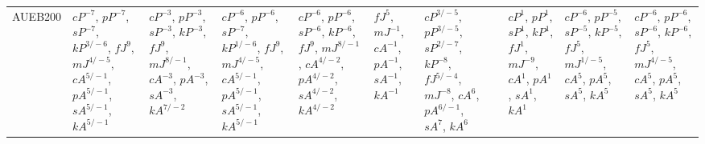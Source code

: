 \documentclass[letterpaper]{article} %
\begin{document}
\begin{sidewaystable*}
\begin{tabular}{l l l l l l l l l l l }
\multirow{10}{1.7cm}{AUEB200} & \multirow{10}{1.7cm}{$cP^{-7}$, $pP^{-7}$, $sP^{-7}$, $kP^{3/-6}$, $fJ^{9}$, $mJ^{4/-5}$, $cA^{5/-1}$, $pA^{5/-1}$, $sA^{5/-1}$, $kA^{5/-1}$} & \multirow{10}{1.7cm}{$cP^{-3}$, $pP^{-3}$, $sP^{-3}$, $kP^{-3}$, $fJ^{9}$, $mJ^{8/-1}$, $cA^{-3}$, $pA^{-3}$, $sA^{-3}$, $kA^{7/-2}$} & \multirow{10}{1.7cm}{$cP^{-6}$, $pP^{-6}$, $sP^{-7}$, $kP^{1/-6}$, $fJ^{9}$, $mJ^{4/-5}$, $cA^{5/-1}$, $pA^{5/-1}$, $sA^{5/-1}$, $kA^{5/-1}$} & \multirow{10}{1.7cm}{$cP^{-6}$, $pP^{-6}$, $sP^{-6}$, $kP^{-6}$, $fJ^{9}$, $mJ^{8/-1}$, $cA^{4/-2}$, $pA^{4/-2}$, $sA^{4/-2}$, $kA^{4/-2}$} & \multirow{10}{1.7cm}{$fJ^{5}$, $mJ^{-1}$, $cA^{-1}$, $pA^{-1}$, $sA^{-1}$, $kA^{-1}$} & \multirow{10}{1.7cm}{$cP^{3/-5}$, $pP^{3/-5}$, $sP^{2/-7}$, $kP^{-8}$, $fJ^{5/-4}$, $mJ^{-8}$, $cA^{6}$, $pA^{6/-1}$, $sA^{7}$, $kA^{6}$} & \multirow{10}{1.7cm}{} & \multirow{10}{1.7cm}{$cP^{1}$, $pP^{1}$, $sP^{1}$, $kP^{1}$, $fJ^{1}$, $mJ^{-9}$, $cA^{1}$, $pA^{1}$, $sA^{1}$, $kA^{1}$} & \multirow{10}{1.7cm}{$cP^{-6}$, $pP^{-5}$, $sP^{-5}$, $kP^{-5}$, $fJ^{5}$, $mJ^{1/-5}$, $cA^{5}$, $pA^{5}$, $sA^{5}$, $kA^{5}$} & \multirow{10}{1.7cm}{$cP^{-6}$, $pP^{-6}$, $sP^{-6}$, $kP^{-6}$, $fJ^{5}$, $mJ^{4/-5}$, $cA^{5}$, $pA^{5}$, $sA^{5}$, $kA^{5}$} \\ \\ \\ \\ \\ \\ \\ \\ \\ \\

\end{tabular}
\end{sidewaystable*}
\end{document}
